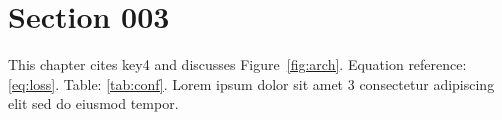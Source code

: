 \section{Section 003}\label{sec:s3}
This chapter cites key4 and discusses Figure~\ref{fig:arch}.
Equation reference: \eqref{eq:loss}. Table: \ref{tab:conf}.
Lorem ipsum dolor sit amet 3 consectetur adipiscing elit sed do eiusmod tempor.
